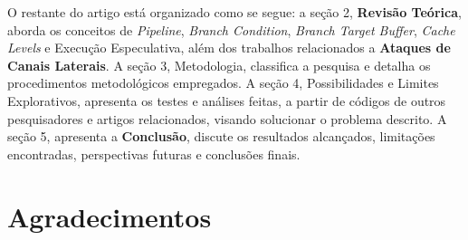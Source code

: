\documentclass[
	article,			    %
	12pt,				    %
	oneside,			    %
	a4paper,			    %
	chapter=TITLE,		    %
	section=TITLE,		    %
	subsection=TITLE,	    %
	english,			    %
	brazil,				    %
	sumario=tradicional
]{abntex2}
\begin{document}
O restante do artigo está organizado como se segue: a seção 2, \textbf{Revisão Teórica}, aborda os conceitos de \emph{Pipeline}, \emph{Branch Condition}, \emph{Branch Target Buffer}, \emph{Cache  Levels} e Execução Especulativa, além dos trabalhos relacionados a \textbf{Ataques de Canais Laterais}. A seção 3, Metodologia, classifica a pesquisa e detalha os procedimentos metodológicos empregados. A seção 4, Possibilidades e Limites Explorativos, apresenta os testes e análises feitas, a partir de códigos de outros pesquisadores e artigos relacionados, visando solucionar o problema descrito. A seção 5, apresenta a \textbf{Conclusão}, discute os resultados alcançados, limitações encontradas, perspectivas futuras e conclusões finais.

\postextual

\begin{apendicesenv}
\end{apendicesenv}
\begin{anexosenv}
\vspace{\onelineskip}
\end{anexosenv}
\section*{Agradecimentos}
\end{document}
